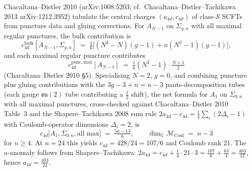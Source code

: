 Chacaltana--Distler 2010 (arXiv:1008.5203; cf.\ Chacaltana--Distler--Tachikawa
2013 arXiv:1212.3952) tabulate the central charges $(a_{4d},c_{4d})$ of
class-$\mathcal{S}$ SCFTs from puncture data and gluing corrections. For
$A_{N-1}$ on $\Sigma_{g,n}$ with all maximal regular punctures, the bulk
contribution is
\[
 c_{4d}^{\mathrm{bulk}}[A_{N-1},\Sigma_{g,n}]
 \;=\;
 \tfrac{1}{6}\bigl[(N^3-N)(g-1) + n(N^2-1)(g-1)\bigr],
\]
and each maximal regular puncture contributes
\[
 c_{4d}^{\mathrm{punc,max}}[A_{N-1}]
 \;=\;
 \tfrac{1}{6}(N^2-1)\cdot \tfrac{N+1}{2}
\]
(Chacaltana--Distler 2010 \S5). Specialising $N = 2$, $g = 0$, and combining
puncture plus gluing contributions with the $3g - 3 + n = n - 3$
pants-decomposition tubes (each gauge $\mathfrak{su}(2)$ tube contributing a
$\tfrac{1}{2}$ shift), the net formula for $A_1$ on $\Sigma_{0,n}$ with all
maximal punctures, cross-checked against Chacaltana--Distler 2010 Table~3 and
the Shapere--Tachikawa 2008 sum rule
$2a_{4d} - c_{4d} = \tfrac{1}{4}\sum_i(2\Delta_i - 1)$ with Coulomb-operator
dimensions $\Delta_i = 2$, is
\begin{equation}
 \boxed{\;
 c_{4d}\bigl[A_1,\Sigma_{0,n},\text{all max}\bigr]
 \;=\; \tfrac{5n - 13}{6},
 \qquad
 \dim_{\mathbb{C}}\mathcal{M}_{\mathrm{Coul}}
 \;=\; n - 3
 \;}
 \label{eq:CD-cn}
\end{equation}
for $n \ge 4$. At $n = 24$ this yields $c_{4d} = 428/24 = 107/6$ and Coulomb
rank $21$. The $a$-anomaly follows from Shapere--Tachikawa:
$2 a_{4d} = c_{4d} + \tfrac{1}{4}\cdot 21\cdot 3 = \tfrac{107}{6} +
\tfrac{63}{4} = \tfrac{403}{12}$, hence $a_{4d} = \tfrac{403}{24}$.

